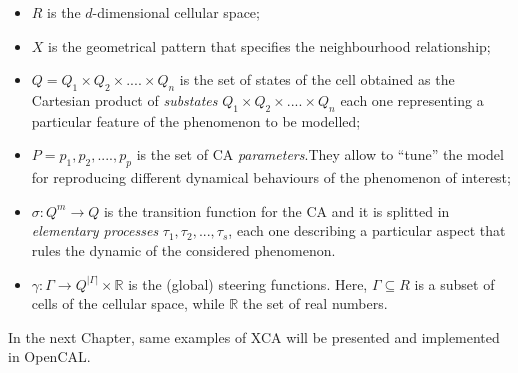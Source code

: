 \begin{itemize}

\item $R$ is the $d$-dimensional cellular space;

\item $X$ is the geometrical pattern that specifies the neighbourhood relationship;

\item $Q = Q_1 \times Q_2 \times....\times Q_n$ is the set of states
  of the cell obtained as the Cartesian product of \emph{substates}
  $Q_1 \times Q_2 \times....\times Q_n$ each one representing a
  particular feature of the phenomenon to be modelled;

\item $P = {p_1,p_2,....,p_p}$ is the set of CA \emph{parameters}.They
  allow to “tune” the model for reproducing different dynamical
  behaviours of the phenomenon of interest;

\item $\sigma : Q^m \rightarrow Q$ is the transition function for the
  CA and it is splitted in \emph{elementary processes} $\tau_1,\tau_2,
  ..., \tau_s$, each one describing a particular aspect that rules the
  dynamic of the considered phenomenon.

\item $\gamma: \Gamma \rightarrow Q^{|\Gamma|} \times \mathbb{R}$ is
  the (global) steering functions. Here, $\Gamma \subseteq R$ is a
  subset of cells of the cellular space, while $\mathbb{R}$ the set of
  real numbers.

\end{itemize}


In the next Chapter, same examples of XCA will be presented and
implemented in OpenCAL.

